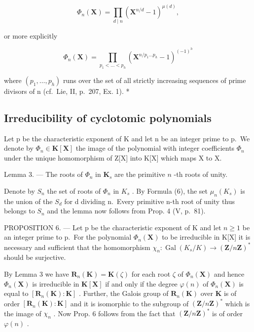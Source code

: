 \[
\Phi_ {n} (\mathbf {X}) = \prod_ {d \mid n} \left(\mathbf {X} ^ {n / d} - 1\right) ^ {\mu (d)},\tag{8}
\]

or more explicitly

\[
\Phi_ {n} (\mathbf {X}) = \prod_ {p _ {1} <   \dots <   p _ {h}} \left(\mathbf {X} ^ {n / p _ {1} \dots p _ {h}} - 1\right) ^ {(- 1) ^ {h}}\tag{9}
\]

where \((p_{1},\ldots,p_{h})\) runs over the set of all strictly increasing sequences of prime divisors of n (cf.~Lie, II, p.~207, Ex. 1). *

\subsection{Irreducibility of cyclotomic polynomials}

Let p be the characteristic exponent of K and let n be an integer prime to p.~We denote by \(\Phi_{n} \in \mathbf{K}[\mathbf{X}]\) the image of the polynomial with integer coefficients \(\Phi_{n}\) under the unique homomorphism of Z{[}X{]} into K{[}X{]} which maps X to X.

Lemma 3. --- The roots of \(\Phi_n\) in \(\mathbf{K}_s\) are the primitive \(n\) -th roots of unity.

Denote by \(S_{n}\) the set of roots of \(\Phi_{n}\) in \(K_{s}\) . By Formula (6), the set \(\mu_{n}(K_{s})\) is the union of the \(S_{d}\) for d dividing n.~Every primitive n-th root of unity thus belongs to \(S_{n}\) and the lemma now follows from Prop. 4 (V, p.~81).

PROPOSITION 6. --- Let p be the characteristic exponent of K and let \(n \geqslant 1\) be an integer prime to p.~For the polynomial \(\Phi_{n}(\mathbf{X})\) to be irreducible in K{[}X{]} it is necessary and sufficient that the homomorphism \(\chi_{n}: \operatorname{Gal}(K_{s}/K) \to (\mathbf{Z}/n\mathbf{Z})^{*}\) should be surjective.

By Lemma 3 we have \(\mathbf{R}_n(\mathbf{K}) = \mathbf{K}(\zeta)\) for each root \(\zeta\) of \(\Phi_n(\mathbf{X})\) and hence \(\Phi_n(\mathbf{X})\) is irreducible in \(\mathbf{K}[\mathbf{X}]\) if and only if the degree \(\varphi(n)\) of \(\Phi_n(\mathbf{X})\) is equal to \([\mathbf{R}_n(\mathbf{K}) : \mathbf{K}]\) . Further, the Galois group of \(\mathbf{R}_n(\mathbf{K})\) over \(\mathbf{K}\) is of order \([\mathbf{R}_n(\mathbf{K}) : \mathbf{K}]\) and it is isomorphic to the subgroup of \((\mathbf{Z}/n\mathbf{Z})^*\) which is the image of \(\chi_n\) . Now Prop. 6 follows from the fact that \((\mathbf{Z}/n\mathbf{Z})^*\) is of order \(\varphi(n)\) .


